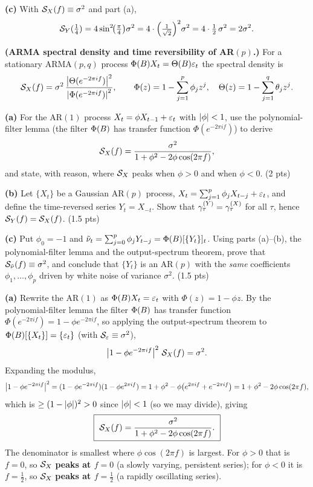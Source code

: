 \documentclass[11pt]{article}
\begin{document}
\textbf{(c)} With $\mathcal{S}_X(f)\equiv\sigma^2$ and part (a),
\[
\mathcal{S}_Y(\tfrac14)=4\sin^2\!\bigl(\tfrac\pi4\bigr)\sigma^2
=4\cdot\Bigl(\tfrac{1}{\sqrt2}\Bigr)^2\sigma^2
=4\cdot\tfrac12\,\sigma^2=2\sigma^2 .
\]

\statementstart
\textbf{(ARMA spectral density and time reversibility of AR$(p)$.)} For a stationary $\mathrm{ARMA}(p,q)$ process $\Phi(B)X_t=\Theta(B)\varepsilon_t$ the spectral density is
\[
\mathcal{S}_X(f)=\sigma^2\,\frac{\left\lvert \Theta(e^{-2\pi i f}) \right\rvert^2}{\left\lvert \Phi(e^{-2\pi i f}) \right\rvert^2},
\qquad
\Phi(z)=1-\sum_{j=1}^p\phi_j z^j,\quad \Theta(z)=1-\sum_{j=1}^q\theta_j z^j .
\]

\textbf{(a)} For the AR$(1)$ process $X_t=\phi X_{t-1}+\varepsilon_t$ with $\left\lvert \phi \right\rvert<1$, use the polynomial-filter lemma (the filter $\Phi(B)$ has transfer function $\Phi(e^{-2\pi i f})$) to derive
\[
\mathcal{S}_X(f)=\frac{\sigma^2}{1+\phi^2-2\phi\cos(2\pi f)} ,
\]
and state, with reason, where $\mathcal{S}_X$ peaks when $\phi>0$ and when $\phi<0$. \hfill(2 pts)

\textbf{(b)} Let $\{X_t\}$ be a Gaussian AR$(p)$ process, $X_t=\sum_{j=1}^p\phi_j X_{t-j}+\varepsilon_t$, and define the time-reversed series $Y_t=X_{-t}$. Show that $\gamma^{(Y)}_\tau=\gamma^{(X)}_\tau$ for all $\tau$, hence $\mathcal{S}_Y(f)=\mathcal{S}_X(f)$. \hfill(1.5 pts)

\textbf{(c)} Put $\phi_0=-1$ and $\tilde\nu_t=\sum_{j=0}^p\phi_j Y_{t-j}=\Phi(B)[\{Y_t\}]_t$. Using parts (a)--(b), the polynomial-filter lemma and the output-spectrum theorem, prove that $\mathcal{S}_{\tilde\nu}(f)\equiv\sigma^2$, and conclude that $\{Y_t\}$ is an AR$(p)$ with the \emph{same} coefficients $\phi_1,\dots,\phi_p$ driven by white noise of variance $\sigma^2$. \hfill(1.5 pts)
\statementend

\textbf{(a)} Rewrite the AR$(1)$ as $\Phi(B)X_t=\varepsilon_t$ with $\Phi(z)=1-\phi z$. By the polynomial-filter lemma the filter $\Phi(B)$ has transfer function $\Phi(e^{-2\pi i f})=1-\phi e^{-2\pi i f}$, so applying the output-spectrum theorem to $\Phi(B)[\{X_t\}]=\{\varepsilon_t\}$ (with $\mathcal{S}_\varepsilon\equiv\sigma^2$),
\[
\left\lvert 1-\phi e^{-2\pi i f} \right\rvert^2\,\mathcal{S}_X(f)=\sigma^2 .
\]
Expanding the modulus,
\[
\left\lvert 1-\phi e^{-2\pi i f} \right\rvert^2=(1-\phi e^{-2\pi i f})(1-\phi e^{2\pi i f})
=1+\phi^2-\phi\bigl(e^{2\pi i f}+e^{-2\pi i f}\bigr)=1+\phi^2-2\phi\cos(2\pi f),
\]
which is $\ge(1-\left\lvert \phi \right\rvert)^2>0$ since $\left\lvert \phi \right\rvert<1$ (so we may divide), giving
\[
\boxed{\ \sdf_X(f)=\frac{\sigma^2}{1+\phi^2-2\phi\cos(2\pi f)} .\ }
\]
The denominator is smallest where $\phi\cos(2\pi f)$ is largest. For $\phi>0$ that is $f=0$, so $\mathcal{S}_X$ \textbf{peaks at $f=0$} (a slowly varying, persistent series); for $\phi<0$ it is $f=\tfrac12$, so $\mathcal{S}_X$ \textbf{peaks at $f=\tfrac12$} (a rapidly oscillating series).
\end{document}
